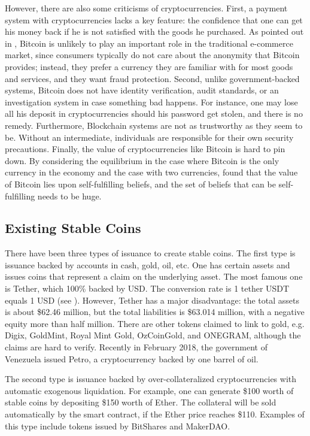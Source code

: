 \documentclass[final,pdftex]{ectaart}
\theoremstyle{plain}
\begin{document}
However, there are also some criticisms of cryptocurrencies. First, a payment system with cryptocurrencies lacks a key feature: the confidence that one can get his money back if he is not satisfied with the goods he purchased. As pointed out in \cite{grinberg_bitcoin:_2011}, Bitcoin is unlikely to play an important role in the traditional e-commerce market, since consumers typically do not care about the anonymity that Bitcoin provides; instead, they prefer a currency they are familiar with for most goods and services, and they want fraud protection.  Second, unlike government-backed systems, Bitcoin does not have identity verification, audit standards, or an investigation system in case something bad happens. For instance, one may lose all his deposit in cryptocurrencies should his password get stolen, and there is no remedy. Furthermore, Blockchain systems are not as trustworthy as they seem to be. Without an intermediate, individuals are responsible for their own security precautions. Finally, the value of cryptocurrencies like Bitcoin is hard to pin down. By considering the equilibrium in the case where Bitcoin is the only currency in the economy and the case with two currencies, \cite{garratt_bitcoin_2018} found that the value of Bitcoin lies upon self-fulfilling beliefs, and the set of beliefs that can be self-fulfilling needs to be huge.


\subsection{Existing Stable Coins}

There have been three types of issuance to create stable coins. The first type is issuance backed by accounts in cash, gold, oil, etc. One has certain assets and issues coins that represent a claim on the underlying asset. The most famous one is Tether, which 100\% backed by USD. The conversion rate is 1 tether USDT equals 1 USD (see \cite{tether_tether:_2016}). However, Tether has a major disadvantage: the total assets is about \$62.46 million, but the total liabilities is \$63.014 million, with a negative equity more than half million. There are other tokens claimed to link to gold, e.g. Digix, GoldMint, Royal Mint Gold, OzCoinGold, and ONEGRAM, although the claims are hard to verify. Recently in February 2018, the government of Venezuela issued Petro, a cryptocurrency backed by one barrel of oil.

The second type is issuance backed by over-collateralized cryptocurrencies with automatic exogenous liquidation. For example, one can generate \$100 worth of stable coins by depositing \$150 worth of Ether. The collateral will be sold automatically by the smart contract, if the Ether price reaches \$110. Examples of this type include tokens issued by BitShares and MakerDAO.
\end{document}
